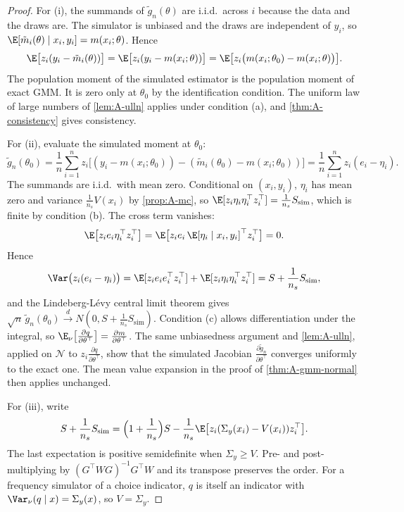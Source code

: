 \begin{proof}
For (i), the summands of $\tilde g_n(\theta)$ are i.i.d.\ across $i$ because the data and the draws are. The simulator is
unbiased and the draws are independent of $y_i$, so $\E[\tilde m_i(\theta) \mid x_i, y_i] = m(x_i;\theta)$. Hence
\begin{equation*}
  \E\bigl[z_i(y_i - \tilde m_i(\theta))\bigr] = \E\bigl[z_i(y_i - m(x_i;\theta))\bigr]
  = \E\bigl[z_i\bigl(m(x_i;\theta_0) - m(x_i;\theta)\bigr)\bigr].
\end{equation*}
The population moment of the simulated estimator is the population moment of exact GMM. It is zero only at
$\theta_0$ by the identification condition. The uniform law of large numbers of \cref{lem:A-ulln} applies under
condition (a), and \cref{thm:A-consistency} gives consistency.

For (ii), evaluate the simulated moment at $\theta_0$:
\begin{equation*}
  \tilde g_n(\theta_0) = \frac{1}{n}\sum_{i=1}^{n} z_i\bigl[(y_i - m(x_i;\theta_0)) - (\tilde m_i(\theta_0) - m(x_i;\theta_0))\bigr]
  = \frac{1}{n}\sum_{i=1}^{n} z_i(e_i - \eta_i).
\end{equation*}
The summands are i.i.d.\ with mean zero. Conditional on $(x_i, y_i)$, $\eta_i$ has mean zero and variance
$\frac{1}{n_s}V(x_i)$ by \cref{prop:A-mc}, so $\E[z_i\eta_i\eta_i^\top z_i^\top] = \frac{1}{n_s}S_{\text{sim}}$, which is
finite by condition (b). The cross term vanishes:
\begin{equation*}
  \E\bigl[z_ie_i\eta_i^\top z_i^\top\bigr] = \E\bigl[z_ie_i\,\E[\eta_i \mid x_i, y_i]^\top z_i^\top\bigr] = 0.
\end{equation*}
Hence
\begin{equation*}
  \Var\bigl(z_i(e_i - \eta_i)\bigr) = \E[z_ie_ie_i^\top z_i^\top] + \E[z_i\eta_i\eta_i^\top z_i^\top]
  = S + \frac{1}{n_s}S_{\text{sim}},
\end{equation*}
and the Lindeberg-L\'evy central limit theorem gives $\sqrt n\,\tilde g_n(\theta_0) \xrightarrow{d} N(0, S +
\frac{1}{n_s}S_{\text{sim}})$. Condition (c) allows differentiation under the integral, so
$\E_\nu\bigl[\frac{\partial q}{\partial\theta^\top}\bigr] = \frac{\partial m}{\partial\theta^\top}$. The same
unbiasedness argument and \cref{lem:A-ulln}, applied on $\mathcal{N}$ to $z_i\frac{\partial q}{\partial\theta^\top}$,
show that the simulated Jacobian $\frac{\partial\tilde g_n}{\partial\theta^\top}$ converges uniformly to the exact one.
The mean value expansion in the proof of \cref{thm:A-gmm-normal} then applies unchanged.

For (iii), write
\begin{equation*}
  S + \frac{1}{n_s}S_{\text{sim}} = \Bigl(1 + \frac{1}{n_s}\Bigr)S - \frac{1}{n_s}\E\bigl[z_i(\Sigma_y(x_i) - V(x_i))z_i^\top\bigr].
\end{equation*}
The last expectation is positive semidefinite when $\Sigma_y \ge V$. Pre- and post-multiplying by
$(G^\top WG)^{-1}G^\top W$ and its transpose preserves the order. For a frequency simulator of a choice indicator,
$q$ is itself an indicator with $\Var_\nu(q \mid x) = \Sigma_y(x)$, so $V = \Sigma_y$.
\end{proof}


